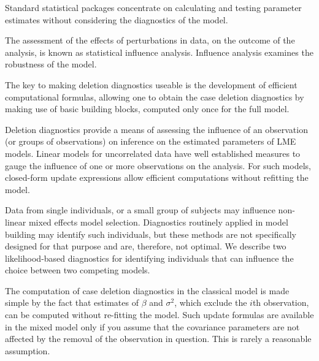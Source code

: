 \documentclass[12pt, a4paper]{report}
\theoremstyle{plain}
\theoremstyle{definition}
\theoremstyle{remark}
\begin{document}

Standard statistical packages concentrate on calculating and testing parameter estimates without considering the diagnostics of the model. 

The assessment of the effects of perturbations in data, on the outcome of the analysis, is known as statistical influence analysis. Influence analysis examines the robustness of the model.



The key to making deletion diagnostics useable is the development of efficient computational formulas, allowing one to obtain the  case deletion diagnostics by making use of basic building blocks, computed only once for the full model.

Deletion diagnostics provide a means of assessing the influence of an observation (or groups of observations) on inference on the estimated parameters of LME models. Linear models for uncorrelated data have well established measures to gauge the influence of one or more observations on the analysis. For such models, closed-form update expressions allow efficient computations without refitting the model.

Data from single individuals, or a small group of subjects may influence non-linear mixed effects model selection. Diagnostics routinely applied in model building may identify such individuals, but these methods are not specifically designed for that purpose and are, therefore, not optimal. We describe two likelihood-based diagnostics for identifying individuals that can influence the choice between two competing models.


The computation of case deletion diagnostics in the classical model is made simple by the fact that estimates of $\beta$ and $\sigma^2$, which exclude the $i$th observation, can be computed without re-fitting the model. Such update formulas are available in the mixed model only if you assume that the covariance parameters are not affected by the removal of the observation in question. This is rarely a reasonable assumption.
%		
%		

\end{document}
